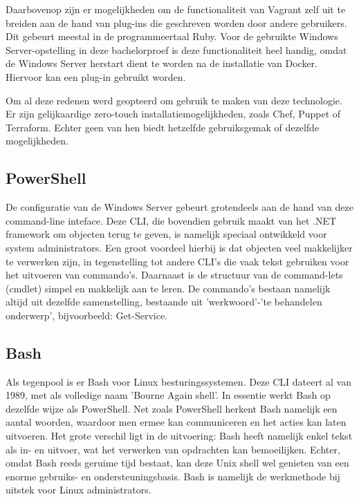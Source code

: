 Daarbovenop zijn er mogelijkheden om de functionaliteit van Vagrant zelf uit te breiden aan de hand van plug-ins die geschreven worden door andere gebruikers. Dit gebeurt meestal in de programmeertaal Ruby. Voor de gebruikte Windows Server-opstelling in deze bachelorproef is deze functionaliteit heel handig, omdat de Windows Server herstart dient te worden na de installatie van Docker. Hiervoor kan een plug-in gebruikt worden.

Om al deze redenen werd geopteerd om gebruik te maken van deze technologie. Er zijn gelijkaardige zero-touch installatiemogelijkheden, zoals Chef, Puppet of Terraform. Echter geen van hen biedt hetzelfde gebruiksgemak of dezelfde mogelijkheden.

\subsection{PowerShell}
De configuratie van de Windows Server gebeurt grotendeels aan de hand van deze command-line inteface. Deze CLI, die bovendien gebruik maakt van het .NET framework om objecten terug te geven, is namelijk speciaal ontwikkeld voor system administrators. Een groot voordeel hierbij is dat objecten veel makkelijker te verwerken zijn, in tegenstelling tot andere CLI’s die vaak tekst gebruiken voor het uitvoeren van commando’s. Daarnaast is de structuur van de command-lets (cmdlet) simpel en makkelijk aan te leren. De commando’s bestaan namelijk altijd uit dezelfde samenstelling, bestaande uit 'werkwoord'-'te behandelen onderwerp', bijvoorbeeld: Get-Service.

\subsection{Bash}
Als tegenpool is er Bash voor Linux besturingssystemen. Deze CLI dateert al van 1989, met als volledige naam 'Bourne Again shell'. In essentie werkt Bash op dezelfde wijze als PowerShell. Net zoals PowerShell herkent Bash namelijk een aantal woorden, waardoor men ermee kan communiceren en het acties kan laten uitvoeren. Het grote verschil ligt in de uitvoering: Bash heeft namelijk enkel tekst als in- en uitvoer, wat het verwerken van opdrachten kan bemoeilijken. Echter, omdat Bash reeds geruime tijd bestaat, kan deze Unix shell wel genieten van een enorme gebruiks- en ondersteuningsbasis. Bash is namelijk de werkmethode bij uitstek voor Linux administrators.


